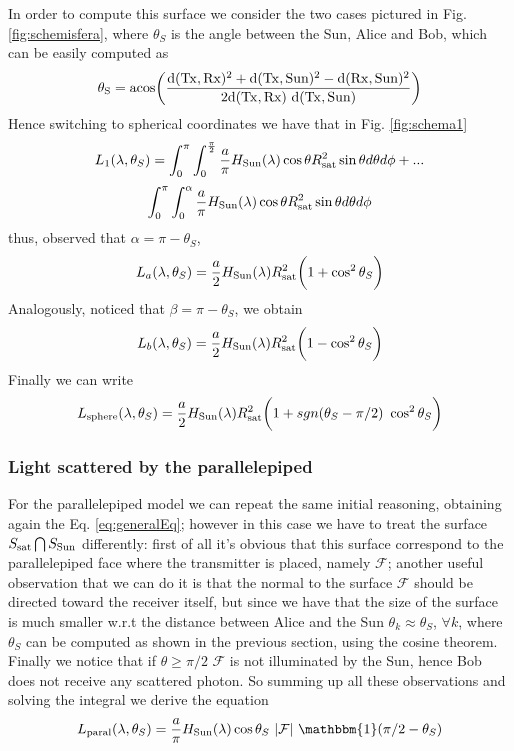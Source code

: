 \documentclass[twocolumn]{article}
\begin{document}
	In order to compute this surface we consider the two cases pictured in Fig. \ref{fig:schemisfera}, where $\theta_S$ is the angle between the Sun, Alice and Bob, which can be easily computed as 
	\begin{equation}
	{\rm \theta_S = acos\bigg( \frac{d(Tx,Rx)^2+d(Tx,Sun)^2-d(Rx,Sun)^2}{2d(Tx,Rx)\ d(Tx,Sun)}\bigg)}
	\end{equation}
	Hence switching to spherical coordinates we have that in Fig. \ref{fig:schema1}
	\[
	L_1(\lambda,\theta_S)= \int_{0}^{\pi}\int_{0}^{\frac{\pi}{2}}\frac{a}{\pi}H_{\rm Sun}(\lambda) \cos\theta R_{\rm sat}^2\sin\theta d\theta d\phi+...
	\]
	\[\int_{0}^{\pi}\int_{0}^{\alpha}\frac{a}{\pi}H_{\rm Sun}(\lambda) \cos\theta R_{\rm sat}^2\sin\theta d\theta d\phi
	\]
	thus, observed that $\alpha = \pi- \theta_S$, 
	\begin{equation}
	L_a(\lambda,\theta_S) = \frac{a}{2}H_{\rm Sun}(\lambda) R_{\rm sat}^2 \bigg(1+ \cos^2\theta_S \bigg) 
	\end{equation}
	Analogously, noticed that $\beta = \pi-\theta_S$, we obtain 
	\begin{equation}
	L_b(\lambda,\theta_S) = \frac{a}{2}H_{\rm Sun}(\lambda)R_{\rm sat}^2 \bigg(1- \cos^2\theta_S \bigg) 
	\end{equation}
	Finally we can write 
	\begin{equation}
	L_{\rm sphere}(\lambda,\theta_S) = \frac{a}{2}H_{\rm Sun}(\lambda)R_{\rm sat}^2 \bigg(1+ sgn(\theta_S -\pi/2)\ \cos^2\theta_S \bigg) 
	\end{equation}
	\subsubsection{Light scattered by the parallelepiped}
	
	For the parallelepiped model we can repeat the same initial reasoning, obtaining again the Eq. \eqref{eq:generalEq}; however in this case we have to treat the surface $S_{\rm sat}\bigcap S_{\rm Sun}$ differently: first of all it's obvious that this surface correspond to the parallelepiped face where the transmitter is placed, namely $\mathcal{F}$; another useful observation that we can do it is that the normal to the surface $\mathcal{F}$ should be directed toward the receiver itself, but since we have that the size of the surface is much smaller w.r.t the distance between Alice and the Sun $\theta_k \approx \theta_S$, $\forall k$, where $\theta_S$ can be computed as shown in the previous section, using the cosine theorem. Finally we notice that if $\theta\geq \pi/2$ $\mathcal{F}$ is not illuminated by the Sun, hence Bob does not receive any scattered photon.
	So summing up all these observations and solving the integral we derive the equation 
	\begin{equation}
	L_{\rm paral}(\lambda,\theta_S)=\frac{a}{\pi}H_{\rm Sun}(\lambda) \cos\theta_S\ |\mathcal{F}|\ \mathbbm{1}(\pi/2-\theta_S)
	\end{equation}
	
\end{document}
